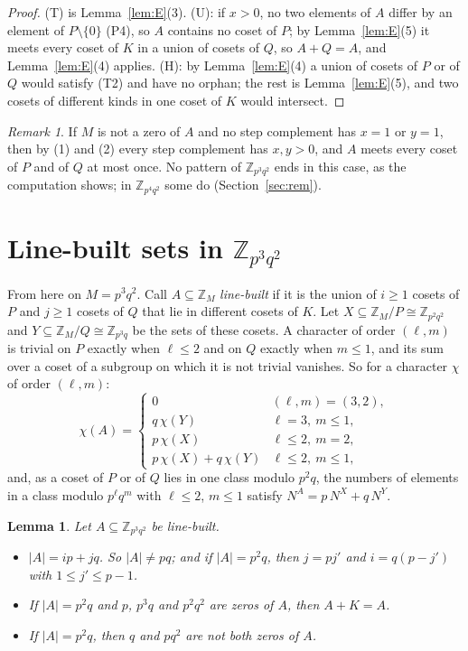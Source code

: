 \documentclass[11pt,a4paper]{amsart}
\newtheorem{lemma}[theorem]{Lemma}
\theoremstyle{definition}
\theoremstyle{remark}
\newtheorem{remark}[theorem]{Remark}
\newcommand{\Z}{\mathbb{Z}}
\begin{document}
\begin{proof}
(T) is Lemma~\ref{lem:E}(3). (U): if $x>0$, no two elements of $A$ differ by an element of
$P\setminus\{0\}$ (P4), so $A$ contains no coset of $P$; by Lemma~\ref{lem:E}(5) it meets every coset of $K$ in
a union of cosets of $Q$, so $A+Q=A$, and Lemma~\ref{lem:E}(4) applies. (H): by Lemma~\ref{lem:E}(4) a union of
cosets of $P$ or of $Q$ would satisfy (T2) and have no orphan; the rest is Lemma~\ref{lem:E}(5), and two cosets
of different kinds in one coset of $K$ would intersect.
\end{proof}

\begin{remark}
If $M$ is not a zero of $A$ and no step complement has $x=1$ or $y=1$, then by (1) and (2) every step complement
has $x,y>0$, and $A$ meets every coset of $P$ and of $Q$ at most once. No pattern of $\Z_{p^3q^2}$ ends in this
case, as the computation shows; in $\Z_{p^4q^2}$ some do (Section~\ref{sec:rem}).
\end{remark}

\section{Line-built sets in \texorpdfstring{$\Z_{p^3q^2}$}{Z\_\{p\^{}3q\^{}2\}}}\label{sec:M}

From here on $M=p^3q^2$. Call $A\subseteq\Z_M$ \emph{line-built} if it is the union of $i\ge1$ cosets of $P$
and $j\ge1$ cosets of $Q$ that lie in different cosets of $K$. Let $X\subseteq\Z_M/P\cong\Z_{p^2q^2}$ and
$Y\subseteq\Z_M/Q\cong\Z_{p^3q}$ be the sets of these cosets. A character of order $(\ell,m)$ is trivial on $P$
exactly when $\ell\le2$ and on $Q$ exactly when $m\le1$, and its sum over a coset of a subgroup on which it is
not trivial vanishes. So for a character $\chi$ of order $(\ell,m)$:
\begin{equation}\label{eq:dict}
\chi(A)=\begin{cases}0&(\ell,m)=(3,2),\\ q\,\chi(Y)&\ell=3,\ m\le1,\\ p\,\chi(X)&\ell\le2,\ m=2,\\
p\,\chi(X)+q\,\chi(Y)&\ell\le2,\ m\le1,\end{cases}
\end{equation}
and, as a coset of $P$ or of $Q$ lies in one class modulo $p^2q$, the numbers of elements in a class modulo
$p^\ell q^m$ with $\ell\le2$, $m\le1$ satisfy $N^A=p\,N^X+q\,N^Y$.

\begin{lemma}\label{lem:M}
Let $A\subseteq\Z_{p^3q^2}$ be line-built.
\begin{itemize}
\item[(M0)] $|A|=ip+jq$. So $|A|\ne pq$; and if $|A|=p^2q$, then $j=pj'$ and $i=q(p-j')$ with $1\le j'\le p-1$.
\item[(M2)] If $|A|=p^2q$ and $p$, $p^3q$ and $p^2q^2$ are zeros of $A$, then $A+K=A$.
\item[(M4)] If $|A|=p^2q$, then $q$ and $pq^2$ are not both zeros of $A$.
\end{itemize}
\end{lemma}
\end{document}
